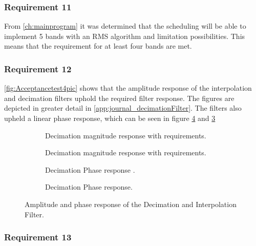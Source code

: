\subsubsection*{Requirement 11}

From \autoref{ch:mainprogram} it was determined that the scheduling will be able to implement 5 bands with an RMS algorithm and limitation possibilities. This means that the requirement for at least four bands are met. 
\vspace*{-5mm}
\subsubsection*{Requirement 12}
\autoref{fig:Acceptancetest4pic} shows that the amplitude response of the interpolation and decimation filters uphold the required filter response. The figures are depicted in greater detail in \autoref{app:journal_decimationFilter}. The filters also upheld a linear phase response, which can be seen in figure \ref{fig:AcceptIntPhase2} and \ref{fig:AcceptDecPhase2}
\begin{figure}[H]
\centering
\begin{subfigure}[t]{0.45\textwidth}
	\centering
	
	\caption{Decimation magnitude response with requirements.}
	\label{fig:acceptDecMag2}
\end{subfigure}
\hfill
\begin{subfigure}[t]{0.45\textwidth}
	\centering
	
	\caption{Decimation magnitude response with requirements.}
	\label{fig:acceptIntMag2}
\end{subfigure} 
\begin{subfigure}[t]{0.45\textwidth}
	\centering
	
	\caption{Decimation Phase response .}
	\label{fig:AcceptDecPhase2}
\end{subfigure} 
\hfill
\begin{subfigure}[t]{0.45\textwidth}
	\centering
	
	\caption{Decimation Phase response.}
	\label{fig:AcceptIntPhase2}
\end{subfigure} 
\caption{Amplitude and phase response of the Decimation and Interpolation Filter.}
\label{fig:Acceptancetest4pic}
\end{figure}
\vspace*{-5mm}
\subsubsection*{Requirement 13}

